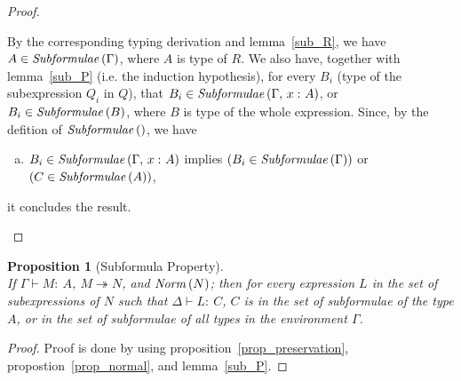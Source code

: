 \documentclass[11p,a4paper]{article}
\newcommand{\typecolor}{}
\newcommand{\termcolor}{}
\newcommand{\tp}[1]{{\typecolor #1}}
\newcommand{\tm}[1]{{\termcolor #1}}
\newtheorem{proposition}[theorem]{Proposition}
\newcommand{\typing}[2]{\tm{#1:\ }\tp{#2}}
\newcommand{\typenvcon}[2]{\tp{\Gamma,}\ \typing{#1}{#2}}
\newcommand{\txt}[1]{\text{\textit{#1}}}
\newcommand{\reducestar}[3]{#1 \overset{#2}\twoheadrightarrow #3}
\newcommand{\subformulae}[1]{\txt{Subformulae}\,(#1)}
\newcommand{\norm}[1]{\txt{Norm}\,(#1)}
\begin{document}
\begin{proof}
\begin{description}
  By the corresponding typing derivation and lemma~\ref{sub_R}, we
  have $A \in \subformulae{\Gamma}$, where $A$ is type of $R$. We also
  have, together with lemma~\ref{sub_P} (i.e. the induction
  hypothesis), for every $B_i$ (type of the subexpression $Q_i$ in
  $Q$), that $B_i \in \subformulae{\typenvcon{x}{A}}$, or $B_i \in
  \subformulae{B}$, where $B$ is type of the whole expression. Since, by the defition of $\subformulae{}$, we have
  \begin{enumerate}[(a)] 
     \item $B_i \in \subformulae{\typenvcon{x}{A}}$ implies $(B_i \in \subformulae{\Gamma})$ or $(C \in \subformulae{A})$,
  \end{enumerate}
  it concludes the result.
\end{description}
\end{proof}

\begin{proposition}[Subformula Property]\ \\
\label{prop_subformula}
If $\Gamma \vdash \typing{M}{A}$, $\reducestar{M}{}{N}$, and $\norm{N}$;
then for every expression $L$ in the set of subexpressions of $N$ such
that $\Delta \vdash \typing{L}{C}$, $C$ is in the set of subformulae of
the type $A$, or in the set of subformulae of all types in the
environment $\Gamma$.
\end{proposition}
\begin{proof}
Proof is done by using proposition~\ref{prop_preservation}, propostion~\ref{prop_normal}, and lemma~\ref{sub_P}.
\end{proof}
 
\end{document}
